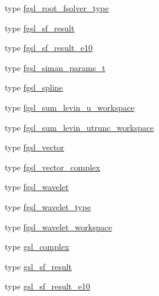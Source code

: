 \begin{DoxyCompactItemize}
type \hyperlink{structfgsl_1_1fgsl__root__fsolver__type}{fgsl\-\_\-root\-\_\-fsolver\-\_\-type}
\item 
type \hyperlink{structfgsl_1_1fgsl__sf__result}{fgsl\-\_\-sf\-\_\-result}
\item 
type \hyperlink{structfgsl_1_1fgsl__sf__result__e10}{fgsl\-\_\-sf\-\_\-result\-\_\-e10}
\item 
type \hyperlink{structfgsl_1_1fgsl__siman__params__t}{fgsl\-\_\-siman\-\_\-params\-\_\-t}
\item 
type \hyperlink{structfgsl_1_1fgsl__spline}{fgsl\-\_\-spline}
\item 
type \hyperlink{structfgsl_1_1fgsl__sum__levin__u__workspace}{fgsl\-\_\-sum\-\_\-levin\-\_\-u\-\_\-workspace}
\item 
type \hyperlink{structfgsl_1_1fgsl__sum__levin__utrunc__workspace}{fgsl\-\_\-sum\-\_\-levin\-\_\-utrunc\-\_\-workspace}
\item 
type \hyperlink{structfgsl_1_1fgsl__vector}{fgsl\-\_\-vector}
\item 
type \hyperlink{structfgsl_1_1fgsl__vector__complex}{fgsl\-\_\-vector\-\_\-complex}
\item 
type \hyperlink{structfgsl_1_1fgsl__wavelet}{fgsl\-\_\-wavelet}
\item 
type \hyperlink{structfgsl_1_1fgsl__wavelet__type}{fgsl\-\_\-wavelet\-\_\-type}
\item 
type \hyperlink{structfgsl_1_1fgsl__wavelet__workspace}{fgsl\-\_\-wavelet\-\_\-workspace}
\item 
type \hyperlink{structfgsl_1_1gsl__complex}{gsl\-\_\-complex}
\item 
type \hyperlink{structfgsl_1_1gsl__sf__result}{gsl\-\_\-sf\-\_\-result}
\item 
type \hyperlink{structfgsl_1_1gsl__sf__result__e10}{gsl\-\_\-sf\-\_\-result\-\_\-e10}
\end{DoxyCompactItemize}
